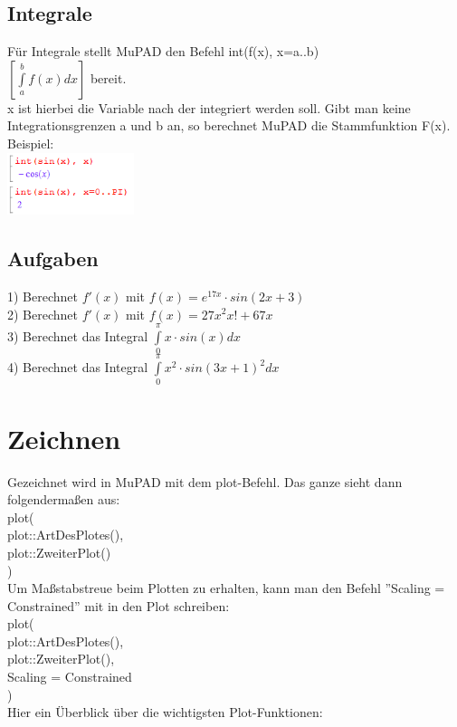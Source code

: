 \documentclass[11pt,final]{scrreprt}
\newcommand{\br} {\medskip\\}
\begin{document}
\subsection{Integrale}
Für Integrale stellt MuPAD den Befehl int(f(x), x=a..b)\\
$\left[\int\limits_a^b f(x) dx\right]$ bereit.\\
x ist hierbei die Variable nach der integriert werden soll. Gibt man keine Integrationsgrenzen a und b an, so berechnet MuPAD die Stammfunktion F(x).
Beispiel:\\
\includegraphics[width = 140px]{images/integrale_1}\\

\subsection{Aufgaben}

1) Berechnet $f'(x)$ mit $f(x) = e^{17x}\cdot sin(2x+3)$\\ 
2) Berechnet $f'(x)$ mit $f(x) = 27x^2x!+67x$\\ 
3) Berechnet das Integral $\int\limits_0^\pi x\cdot sin(x) dx $\\
4) Berechnet das Integral $\int\limits_0^\pi x^2\cdot sin(3x+1)^2 dx $\\

\section{Zeichnen}

Gezeichnet wird in MuPAD mit dem plot-Befehl. Das ganze sieht dann folgendermaßen aus:\br
\hspace*{1em}plot(\\
\hspace*{2em} plot::ArtDesPlotes(),\\
\hspace*{2em} plot::ZweiterPlot()\\
\hspace*{1em})\br
Um Maßstabstreue beim Plotten zu erhalten, kann man den Befehl ''Scaling = Constrained'' mit in den Plot schreiben:\br
\hspace*{1em}plot(\\
\hspace*{2em} plot::ArtDesPlotes(),\\
\hspace*{2em} plot::ZweiterPlot(),\\
\hspace*{2em} Scaling = Constrained\\
\hspace*{1em})\br
Hier ein Überblick über die wichtigsten Plot-Funktionen:\\
\end{document}
